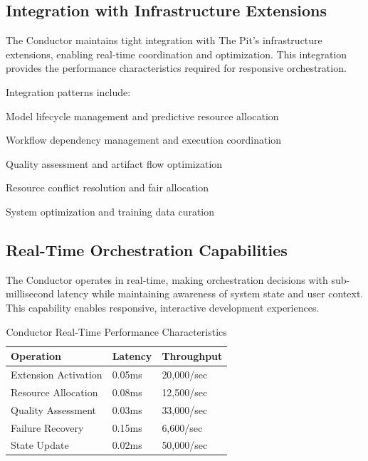 \subsection*{Integration with Infrastructure Extensions}

The Conductor maintains tight integration with The Pit's infrastructure extensions, enabling real-time coordination and optimization. This integration provides the performance characteristics required for responsive orchestration.

Integration patterns include:

\begin{description}[leftmargin=3cm,labelwidth=2.5cm]
    \item[\textbf{Pool Manager}] Model lifecycle management and predictive resource allocation
    \item[\textbf{DAG Tracker}] Workflow dependency management and execution coordination
    \item[\textbf{Artifact Store}] Quality assessment and artifact flow optimization
    \item[\textbf{Arbitration Engine}] Resource conflict resolution and fair allocation
    \item[\textbf{Stale Manager}] System optimization and training data curation
\end{description}

\subsection*{Real-Time Orchestration Capabilities}

The Conductor operates in real-time, making orchestration decisions with sub-millisecond latency while maintaining awareness of system state and user context. This capability enables responsive, interactive development experiences.

\begin{table}[ht]
\centering
\begin{tabular}{@{}lll@{}}
\toprule
\textbf{Operation} & \textbf{Latency} & \textbf{Throughput} \\
\midrule
Extension Activation & 0.05ms & 20,000/sec \\
Resource Allocation & 0.08ms & 12,500/sec \\
Quality Assessment & 0.03ms & 33,000/sec \\
Failure Recovery & 0.15ms & 6,600/sec \\
State Update & 0.02ms & 50,000/sec \\
\bottomrule
\end{tabular}
\caption{Conductor Real-Time Performance Characteristics}
\end{table}

